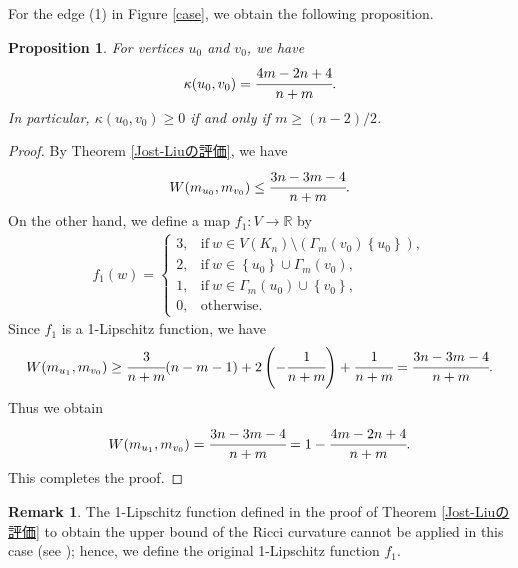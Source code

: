 \documentclass[leqno,12pt]{amsart} %
\theoremstyle{plain} %
\newtheorem{proposition}[theorem]{\indent\sc Proposition}
\theoremstyle{definition} %
\newtheorem{remark}[theorem]{\indent\sc Remark}
\begin{document}
For the edge (1) in Figure \ref{case}, we obtain the following proposition.
\begin{proposition}
\label{１番目}
For vertices $u_0$ and $v_0$, we have
\begin{eqnarray*}
\kappa(u_0, v_0) = \cfrac{4m-2n+4}{n+m}.
\end{eqnarray*}
In particular, $\kappa(u_0, v_0) \geq 0$ if and only if $m \geq (n-2)/2$.
\end{proposition}
\begin{proof}
By Theorem \ref{Jost-Liuの評価}, we have
\begin{eqnarray*}
W(m_{u_0}, m_{v_0}) \leq \cfrac{3n-3m-4}{n+m} .
\end{eqnarray*}
On the other hand, we define a map $f_1 : V \to \mathbb{R}$ by
\begin{eqnarray*}
f_1 (w)=
\begin{cases}
3, & \mathrm{if}\ w \in V(K_n) \setminus( \Gamma_m (v_0) \left\{ u_0 \right\} ),\\
2, & \mathrm{if}\ w \in \left\{u_0 \right\} \cup \Gamma_m (v_0),\\
1, & \mathrm{if}\ w \in \Gamma_m (u_0) \cup \left\{ v_0 \right\},\\
0, & \mathrm{otherwise}.
\end{cases}
\end{eqnarray*}
Since $f_1$ is a 1-Lipschitz function, we have
\begin{eqnarray*}
W(m_{u_1}, m_{v_0}) \geq  \cfrac{3}{n+m} (n-m-1) + 2 \left( - \cfrac{1}{n+m} \right) + \cfrac{1}{n+m}= \cfrac{3n-3m-4}{n+m}.
\end{eqnarray*}
Thus we obtain
\begin{eqnarray*}
W(m_{u_1}, m_{v_0}) = \cfrac{3n-3m-4}{n+m}= 1- \cfrac{4m-2n+4}{n+m}.
\end{eqnarray*}
This completes the proof.
\end{proof}
\begin{remark}
The 1-Lipschitz function defined in the proof of Theorem \ref{Jost-Liuの評価} to obtain the upper bound of the Ricci curvature cannot be applied in this case (see \cite{Jo2}); hence, we define the original 1-Lipschitz function $f_1$.
\end{remark}
\end{document}
